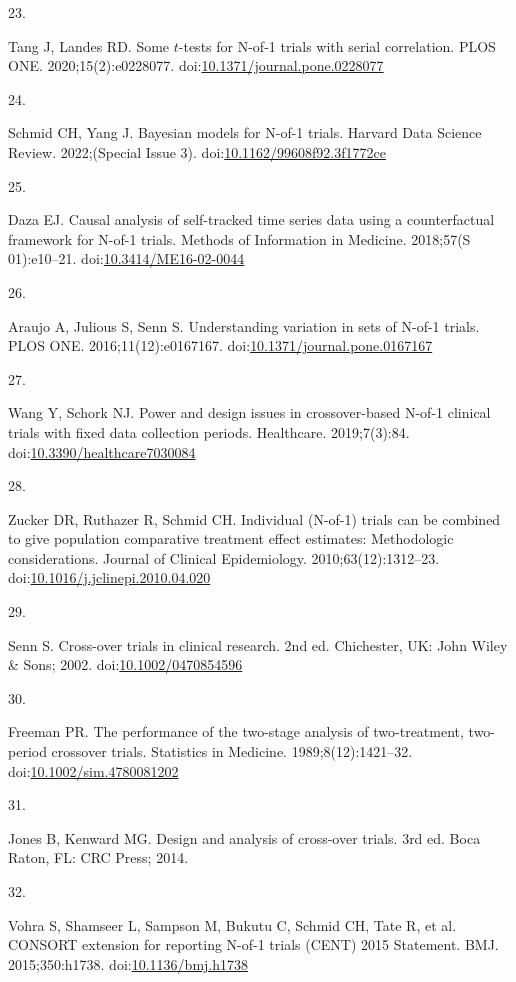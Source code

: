 \documentclass[
  11pt,
]{article}
\newlength{\cslhangindent}
\newlength{\csllabelwidth}
\newenvironment{CSLReferences}[2] %
 {\begin{list}{}{%
  \setlength{\itemindent}{0pt}
  \setlength{\leftmargin}{0pt}
  \setlength{\parsep}{0pt}
  \ifodd #1
   \setlength{\leftmargin}{\cslhangindent}
   \setlength{\itemindent}{-1\cslhangindent}
  \fi
  \setlength{\itemsep}{#2\baselineskip}}}
 {\end{list}}
\newcommand{\CSLLeftMargin}[1]{\parbox[t]{\csllabelwidth}{\strut#1\strut}}
\newcommand{\CSLRightInline}[1]{\parbox[t]{\linewidth - \csllabelwidth}{\strut#1\strut}}
\begin{document}
\begin{CSLReferences}{0}{1}
\CSLLeftMargin{23. }%
\CSLRightInline{Tang J, Landes RD. Some \(t\)-tests for {N}-of-1 trials with serial correlation. PLOS ONE. 2020;15(2):e0228077. doi:\href{https://doi.org/10.1371/journal.pone.0228077}{10.1371/journal.pone.0228077}}

\CSLLeftMargin{24. }%
\CSLRightInline{Schmid CH, Yang J. Bayesian models for {N}-of-1 trials. Harvard Data Science Review. 2022;(Special Issue 3). doi:\href{https://doi.org/10.1162/99608f92.3f1772ce}{10.1162/99608f92.3f1772ce}}

\CSLLeftMargin{25. }%
\CSLRightInline{Daza EJ. Causal analysis of self-tracked time series data using a counterfactual framework for {N}-of-1 trials. Methods of Information in Medicine. 2018;57(S 01):e10--21. doi:\href{https://doi.org/10.3414/ME16-02-0044}{10.3414/ME16-02-0044}}

\CSLLeftMargin{26. }%
\CSLRightInline{Araujo A, Julious S, Senn S. Understanding variation in sets of {N}-of-1 trials. PLOS ONE. 2016;11(12):e0167167. doi:\href{https://doi.org/10.1371/journal.pone.0167167}{10.1371/journal.pone.0167167}}

\CSLLeftMargin{27. }%
\CSLRightInline{Wang Y, Schork NJ. Power and design issues in crossover-based {N}-of-1 clinical trials with fixed data collection periods. Healthcare. 2019;7(3):84. doi:\href{https://doi.org/10.3390/healthcare7030084}{10.3390/healthcare7030084}}

\CSLLeftMargin{28. }%
\CSLRightInline{Zucker DR, Ruthazer R, Schmid CH. Individual ({N}-of-1) trials can be combined to give population comparative treatment effect estimates: Methodologic considerations. Journal of Clinical Epidemiology. 2010;63(12):1312--23. doi:\href{https://doi.org/10.1016/j.jclinepi.2010.04.020}{10.1016/j.jclinepi.2010.04.020}}

\CSLLeftMargin{29. }%
\CSLRightInline{Senn S. Cross-over trials in clinical research. 2nd ed. Chichester, UK: John Wiley \& Sons; 2002. doi:\href{https://doi.org/10.1002/0470854596}{10.1002/0470854596}}

\CSLLeftMargin{30. }%
\CSLRightInline{Freeman PR. The performance of the two-stage analysis of two-treatment, two-period crossover trials. Statistics in Medicine. 1989;8(12):1421--32. doi:\href{https://doi.org/10.1002/sim.4780081202}{10.1002/sim.4780081202}}

\CSLLeftMargin{31. }%
\CSLRightInline{Jones B, Kenward MG. Design and analysis of cross-over trials. 3rd ed. Boca Raton, FL: CRC Press; 2014.}

\CSLLeftMargin{32. }%
\CSLRightInline{Vohra S, Shamseer L, Sampson M, Bukutu C, Schmid CH, Tate R, et al. {CONSORT} extension for reporting {N}-of-1 trials ({CENT}) 2015 {S}tatement. BMJ. 2015;350:h1738. doi:\href{https://doi.org/10.1136/bmj.h1738}{10.1136/bmj.h1738}}

\end{CSLReferences}
\end{document}
